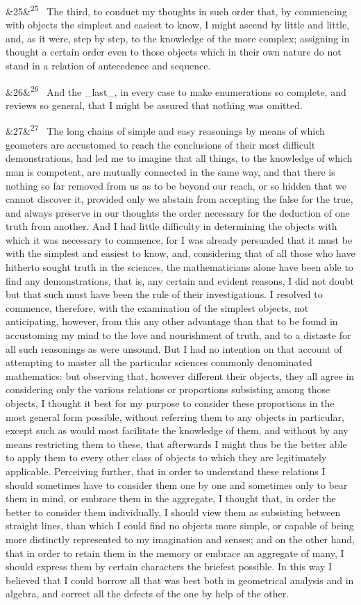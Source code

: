 \documentclass[12pt]{article}
\newcommand{\para}[1][]{\par\noindent\ifx&#1&\else\textsuperscript{\footnotesize #1}~\fi}
\begin{document}
\para[25] The third, to conduct my thoughts in such order that, by commencing with objects the simplest and easiest to know, I might ascend by little and little, and, as it were, step by step, to the knowledge of the more complex; assigning in thought a certain order even to those objects which in their own nature do not stand in a relation of antecedence and sequence.

\para[26] And the \_last\_, in every case to make enumerations so complete, and reviews so general, that I might be assured that nothing was omitted.

\para[27] The long chains of simple and easy reasonings by means of which geometers are accustomed to reach the conclusions of their most difficult demonstrations, had led me to imagine that all things, to the knowledge of which man is competent, are mutually connected in the same way, and that there is nothing so far removed from us as to be beyond our reach, or so hidden that we cannot discover it, provided only we abstain from accepting the false for the true, and always preserve in our thoughts the order necessary for the deduction of one truth from another. And I had little difficulty in determining the objects with which it was necessary to commence, for I was already persuaded that it must be with the simplest and easiest to know, and, considering that of all those who have hitherto sought truth in the sciences, the mathematicians alone have been able to find any demonstrations, that is, any certain and evident reasons, I did not doubt but that such must have been the rule of their investigations. I resolved to commence, therefore, with the examination of the simplest objects, not anticipating, however, from this any other advantage than that to be found in accustoming my mind to the love and nourishment of truth, and to a distaste for all such reasonings as were unsound. But I had no intention on that account of attempting to master all the particular sciences commonly denominated mathematics: but observing that, however different their objects, they all agree in considering only the various relations or proportions subsisting among those objects, I thought it best for my purpose to consider these proportions in the most general form possible, without referring them to any objects in particular, except such as would most facilitate the knowledge of them, and without by any means restricting them to these, that afterwards I might thus be the better able to apply them to every other class of objects to which they are legitimately applicable. Perceiving further, that in order to understand these relations I should sometimes have to consider them one by one and sometimes only to bear them in mind, or embrace them in the aggregate, I thought that, in order the better to consider them individually, I should view them as subsisting between straight lines, than which I could find no objects more simple, or capable of being more distinctly represented to my imagination and senses; and on the other hand, that in order to retain them in the memory or embrace an aggregate of many, I should express them by certain characters the briefest possible. In this way I believed that I could borrow all that was best both in geometrical analysis and in algebra, and correct all the defects of the one by help of the other.
\end{document}

